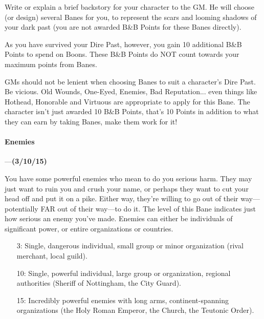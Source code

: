\documentclass[oneside,11pt,english]{book}
\begin{document}
Write or explain a brief backstory for your character to the GM. He will choose (or design) several Banes 
for you, to represent the scars and looming shadows of your dark past (you are not awarded B\&B Points 
for these Banes directly).


As you have survived your Dire Past, however, you gain 10 additional B\&B Points to spend on Boons. 
These B\&B Points do NOT count towards your maximum points from Banes. 


GMs should not be lenient when choosing Banes to suit a character’s Dire Past. Be vicious. Old Wounds, 
One-Eyed, Enemies, Bad Reputation... even things like Hothead, Honorable and Virtuous are appropriate 
to apply for this Bane. The character isn’t just awarded 10 B\&B Points, that’s 10 Points in addition to what they can earn by taking Banes, make them work for it! 
\paragraph{\label{bane:Enemies}Enemies}---\quad\textbf{(3/10/15) }\par
You have some powerful enemies who mean to do you serious harm. They may just want to ruin you and 
crush your name, or perhaps they want to cut your head off and put it on a pike. Either way, they're 
willing to go out of their way—potentially FAR out of their way—to do it. The level of this Bane 
indicates just how serious an enemy you've made. Enemies can either be individuals of significant power, or entire organizations or countries. 
\begin{itemize}
	\item [3:] Single, dangerous individual, small group or minor organization (rival merchant, local guild). 
	\item [10:] Single, powerful individual, large group or organization, regional authorities (Sheriff of Nottingham, the City Guard).
	\item [15:] Incredibly powerful enemies with long arms, continent-spanning organizations (the Holy Roman Emperor, the Church, the Teutonic Order).
\end{itemize}
\end{document}

